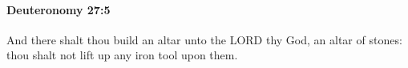 
		\paragraph{Deuteronomy 27:5} %
			\label{DEUTERONOMY-27-5}

			And there shalt thou build an altar unto the LORD thy God, an altar of stones: thou shalt not lift up any iron tool upon them.


